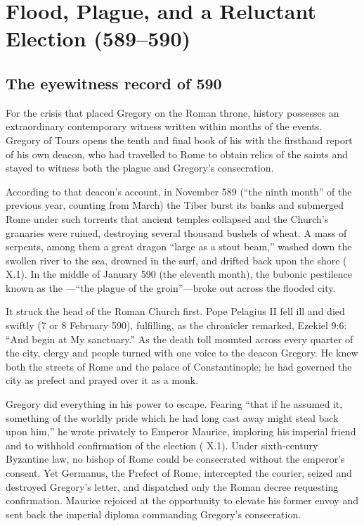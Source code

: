 \section{Flood, Plague, and a Reluctant Election (589--590)}

\subsection{The eyewitness record of 590}

For the crisis that placed Gregory on the Roman throne, history possesses an
extraordinary contemporary witness written within months of the events.
Gregory of Tours opens the tenth and final book of his  with the firsthand report of his own deacon, who had travelled to
Rome to obtain relics of the saints and stayed to witness both the plague and
Gregory's consecration.

According to that deacon's account, in November 589 (``the ninth month'' of the
previous year, counting from March) the Tiber burst its banks and submerged
Rome under such torrents that ancient temples collapsed and the Church's
granaries were ruined, destroying several thousand bushels of wheat. A mass of
serpents, among them a great dragon ``large as a stout beam,'' washed down the
swollen river to the sea, drowned in the surf, and drifted back upon the shore
( X.1). In the middle of January 590 (the eleventh
month), the bubonic pestilence known as the ---``the
plague of the groin''---broke out across the flooded city.

It struck the head of the Roman Church first. Pope Pelagius II fell ill and
died swiftly (7 or 8 February 590), fulfilling, as the chronicler remarked,
Ezekiel 9:6: ``And begin at My sanctuary.'' As the death toll mounted across
every quarter of the city, clergy and people turned with one voice to the
deacon Gregory. He knew both the streets of Rome and the palace of
Constantinople; he had governed the city as prefect and prayed over it as a
monk.

Gregory did everything in his power to escape. Fearing ``that if he assumed it,
something of the worldly pride which he had long cast away might steal back
upon him,'' he wrote privately to Emperor Maurice, imploring his imperial
friend and  to withhold confirmation of the election
( X.1). Under sixth-century Byzantine law, no bishop
of Rome could be consecrated without the emperor's consent. Yet Germanus, the
Prefect of Rome, intercepted the courier, seized and destroyed Gregory's
letter, and dispatched only the Roman decree requesting confirmation. Maurice
rejoiced at the opportunity to elevate his former envoy and sent back the
imperial diploma commanding Gregory's consecration.

